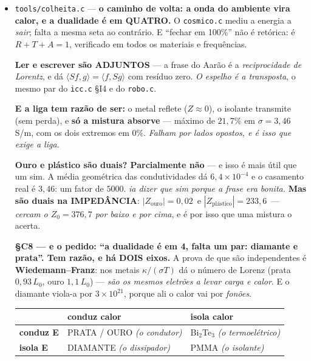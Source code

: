 \documentclass[11pt]{article}
\newcommand{\code}[1]{\texttt{\small #1}}
\theoremstyle{plain}
\theoremstyle{remark}
\begin{document}
\begin{itemize}
\textbf{§X7 --- a SETA.} \emph{``O cérebro é corpo quente, o ambiente frio; a seta é só numa direção
quando vivo, e quando morto inverte até virar ambiente.''} Vivo, o gradiente é \emph{estacionário}
--- o metabolismo repõe. Morto, relaxa por Newton e converge. E \textbf{se o ambiente é mais quente
a seta inverte}: o cadáver aquece. \emph{A seta não é propriedade do corpo --- é do PAR.} E o
headjack para: Carnot cai de $4{,}84\%$ a $0{,}74\%$ em 24\,h --- \emph{a máquina não para por
avaria, para porque o corpo parou de a alimentar}. \textbf{16 unidades, resíduo 0.}


\item \code{tools/colheita.c} --- \textbf{o caminho de volta: a onda do ambiente vira calor, e a
dualidade é em QUATRO.} O \code{cosmico.c} mediu a energia a \emph{sair}; falta a mesma seta ao
contrário. E ``fechar em 100\%'' não é retórica: é $R+T+A=1$, verificado em todos os materiais e
frequências.

\textbf{Ler e escrever são ADJUNTOS} --- a frase do Aarão é a \emph{reciprocidade de Lorentz}, e dá
$\langle Sf,g\rangle = \langle f,Sg\rangle$ com resíduo zero. \emph{O espelho é a transposta}, o
mesmo par do \code{icc.c} §I4 e do \code{robo.c}.

\textbf{E a liga tem razão de ser:} o metal reflete ($Z\approx0$), o isolante transmite (sem perda),
e \textbf{só a mistura absorve} --- máximo de $21{,}7\%$ em $\sigma = 3{,}46$\,S/m, com os dois
extremos em $0\%$. \emph{Falham por lados opostos, e é isso que exige a liga.}

\textbf{Ouro e plástico são duais? Parcialmente não} --- e isso é mais útil que um sim. A média
geométrica das condutividades dá $6{,}4\times10^{-4}$ e o casamento real é $3{,}46$: um fator de
$5000$. \emph{ia dizer que sim porque a frase era bonita.} \textbf{Mas são duais na IMPEDÂNCIA}:
$|Z_{\text{ouro}}| = 0{,}02$\,\textohm{} e $|Z_{\text{plástico}}| = 233{,}6$\,\textohm{} ---
\emph{cercam o $Z_0=376{,}7$ por baixo e por cima}, e é por isso que uma mistura o acerta.

\textbf{§C8 --- e o pedido: ``a dualidade é em 4, falta um par: diamante e prata''. Tem razão, e há
DOIS eixos.} A prova de que são independentes é \textbf{Wiedemann--Franz}: nos metais
$\kappa/(\sigma T)$ dá o número de Lorenz (prata $0{,}93\,L_0$, ouro $1{,}1\,L_0$) --- \emph{são os
mesmos eletrões a levar carga e calor}. E o diamante viola-a por \textbf{$3\times10^{21}$}, porque
ali o calor vai por \emph{fonões}.

\begin{center}
\begin{tabular}{lll}
\toprule
 & conduz calor & isola calor \\
\midrule
\textbf{conduz E} & PRATA / OURO \emph{(o condutor)} & Bi$_2$Te$_3$ \emph{(o termoelétrico)} \\
\textbf{isola E} & DIAMANTE \emph{(o dissipador)} & PMMA \emph{(o isolante)} \\
\bottomrule
\end{tabular}
\end{center}


\end{itemize}
\end{document}
